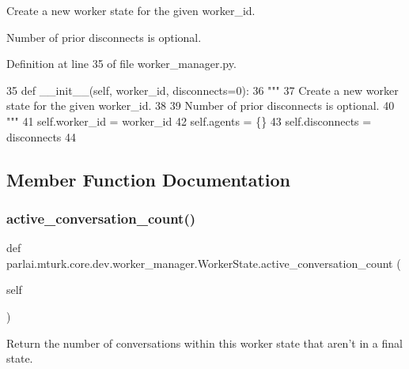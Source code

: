 \begin{DoxyVerb}Create a new worker state for the given worker_id.

Number of prior disconnects is optional.
\end{DoxyVerb}
 

Definition at line 35 of file worker\+\_\+manager.\+py.


\begin{DoxyCode}
35     \textcolor{keyword}{def }\_\_init\_\_(self, worker\_id, disconnects=0):
36         \textcolor{stringliteral}{"""}
37 \textcolor{stringliteral}{        Create a new worker state for the given worker\_id.}
38 \textcolor{stringliteral}{}
39 \textcolor{stringliteral}{        Number of prior disconnects is optional.}
40 \textcolor{stringliteral}{        """}
41         self.worker\_id = worker\_id
42         self.agents = \{\}
43         self.disconnects = disconnects
44 
\end{DoxyCode}


\subsection{Member Function Documentation}
\mbox{\label{classparlai_1_1mturk_1_1core_1_1dev_1_1worker__manager_1_1WorkerState_a16edfbd2d655096cbd8c42ab44aad988}} 
\subsubsection{\texorpdfstring{active\+\_\+conversation\+\_\+count()}{active\_conversation\_count()}}
{\footnotesize\ttfamily def parlai.\+mturk.\+core.\+dev.\+worker\+\_\+manager.\+Worker\+State.\+active\+\_\+conversation\+\_\+count (\begin{DoxyParamCaption}\item[{}]{self }\end{DoxyParamCaption})}

\begin{DoxyVerb}Return the number of conversations within this worker state that aren't in a
final state.
\end{DoxyVerb}
 

